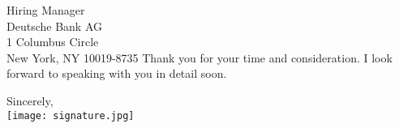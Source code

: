 \documentclass[letterpaper,12pt]{letter}
\begin{document}
\begin{letter}{%
    Hiring Manager \\ 
	Deutsche Bank AG \\
	1 Columbus Circle \\
	New York, NY 10019-8735
}
Thank you for your time and consideration. I look forward to speaking with you in detail soon.

\closing{Sincerely, \\
\vspace{10pt}
\texttt{[image: signature.jpg]}}


\end{letter}

\end{document}
